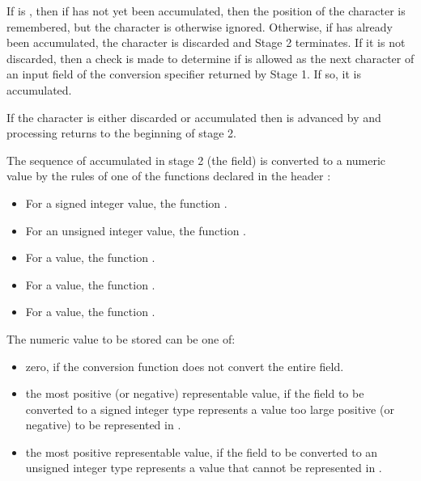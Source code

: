 \begin{itemdescr}
\begin{description}
If  is , then if
has not yet been accumulated, then the position of the character is remembered,
but the character is otherwise ignored.
Otherwise, if
has already been accumulated, the character is discarded and
Stage 2 terminates.
If it is not discarded, then a check is made to determine if  is
allowed as the next character of an input field of the conversion specifier
returned by Stage 1. If so, it is accumulated.

If the character is either discarded or accumulated then 
is advanced by
and processing returns to the beginning of stage 2.

The sequence of  accumulated in stage 2 (the field) is converted to a numeric value by the rules of one of the functions declared in the header :

\begin{itemize}
\item For a signed integer value, the function .

\item For an unsigned integer value, the function .

\item For a  value, the function .

\item For a  value, the function .

\item For a  value, the function .
\end{itemize}

The numeric value to be stored can be one of:

\begin{itemize}
\item zero, if the conversion function does not convert the entire field.

\item the most positive (or negative) representable value,
if the field to be converted to a signed integer type represents a value
too large positive (or negative) to be represented in .

\item the most positive representable value,
if the field to be converted to an unsigned integer type represents a value
that cannot be represented in .


\end{itemize}
\end{description}
\end{itemdescr}
